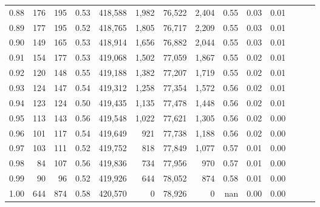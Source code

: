 \begin{tabular}{rrrrrrrrrrrrrr}
0.88 &     176 &    195 &  0.53 &  418,588 &    1,982 &  76,522 &   2,404 &  0.55 &  0.03 &      0.01 \\
0.89 &     177 &    195 &  0.52 &  418,765 &    1,805 &  76,717 &   2,209 &  0.55 &  0.03 &      0.01 \\
0.90 &     149 &    165 &  0.53 &  418,914 &    1,656 &  76,882 &   2,044 &  0.55 &  0.03 &      0.01 \\
0.91 &     154 &    177 &  0.53 &  419,068 &    1,502 &  77,059 &   1,867 &  0.55 &  0.02 &      0.01 \\
0.92 &     120 &    148 &  0.55 &  419,188 &    1,382 &  77,207 &   1,719 &  0.55 &  0.02 &      0.01 \\
0.93 &     124 &    147 &  0.54 &  419,312 &    1,258 &  77,354 &   1,572 &  0.56 &  0.02 &      0.01 \\
0.94 &     123 &    124 &  0.50 &  419,435 &    1,135 &  77,478 &   1,448 &  0.56 &  0.02 &      0.01 \\
0.95 &     113 &    143 &  0.56 &  419,548 &    1,022 &  77,621 &   1,305 &  0.56 &  0.02 &      0.00 \\
0.96 &     101 &    117 &  0.54 &  419,649 &      921 &  77,738 &   1,188 &  0.56 &  0.02 &      0.00 \\
0.97 &     103 &    111 &  0.52 &  419,752 &      818 &  77,849 &   1,077 &  0.57 &  0.01 &      0.00 \\
0.98 &      84 &    107 &  0.56 &  419,836 &      734 &  77,956 &     970 &  0.57 &  0.01 &      0.00 \\
0.99 &      90 &     96 &  0.52 &  419,926 &      644 &  78,052 &     874 &  0.58 &  0.01 &      0.00 \\
1.00 &     644 &    874 &  0.58 &  420,570 &        0 &  78,926 &       0 &   nan &  0.00 &      0.00 \\
\bottomrule
\end{tabular}
